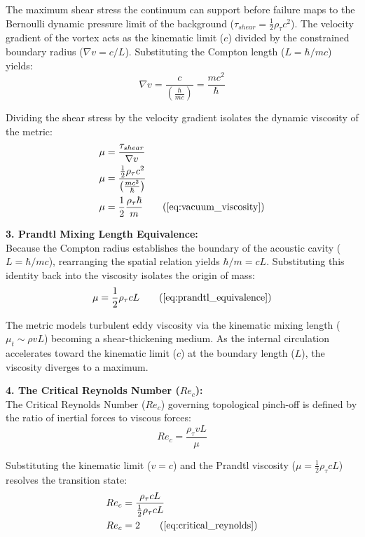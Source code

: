 The maximum shear stress the continuum can support before failure maps to the Bernoulli dynamic pressure limit of the background ($\tau_{shear} = \frac{1}{2} \rho_{\tau} c^2$). 
The velocity gradient of the vortex acts as the kinematic limit ($c$) divided by the constrained boundary radius ($\nabla v = c / L$). Substituting the Compton length ($L = \hbar/mc$) yields:
\begin{equation}
    \nabla v = \frac{c}{\left(\frac{\hbar}{mc}\right)} = \frac{mc^2}{\hbar} 
\end{equation}

Dividing the shear stress by the velocity gradient isolates the dynamic viscosity of the metric:
\begin{align}
    \mu &= \frac{\tau_{shear}}{\nabla v}  \\
    \mu &= \frac{\frac{1}{2} \rho_{\tau} c^2}{\left( \frac{mc^2}{\hbar} \right)}  \\
    \mu &= \frac{1}{2} \frac{\rho_{\tau} \hbar}{m} \tag{\ref{eq:vacuum_viscosity}}
\end{align}

\textbf{3. Prandtl Mixing Length Equivalence:} \\
Because the Compton radius establishes the boundary of the acoustic cavity ($L = \hbar/mc$), rearranging the spatial relation yields $\hbar/m = cL$. Substituting this identity back into the viscosity isolates the origin of mass: 
\begin{equation}
    \mu = \frac{1}{2} \rho_{\tau} c L \tag{\ref{eq:prandtl_equivalence}}
\end{equation}

The metric models turbulent eddy viscosity via the kinematic mixing length ($\mu_t \sim \rho v L$) becoming a shear-thickening medium. As the internal circulation accelerates toward the kinematic limit ($c$) at the boundary length ($L$), the viscosity diverges to a maximum. 

\textbf{4. The Critical Reynolds Number ($Re_c$):} \\
The Critical Reynolds Number ($Re_c$) governing topological pinch-off is defined by the ratio of inertial forces to viscous forces:
\begin{equation}
    Re_c = \frac{\rho_{\tau} v L}{\mu} 
\end{equation}

Substituting the kinematic limit ($v=c$) and the Prandtl viscosity ($\mu = \frac{1}{2} \rho_{\tau} c L$) resolves the transition state:
\begin{align}
    Re_c &= \frac{\rho_{\tau} c L}{\frac{1}{2} \rho_{\tau} c L}  \\
    Re_c &= 2 \tag{\ref{eq:critical_reynolds}}
\end{align}

